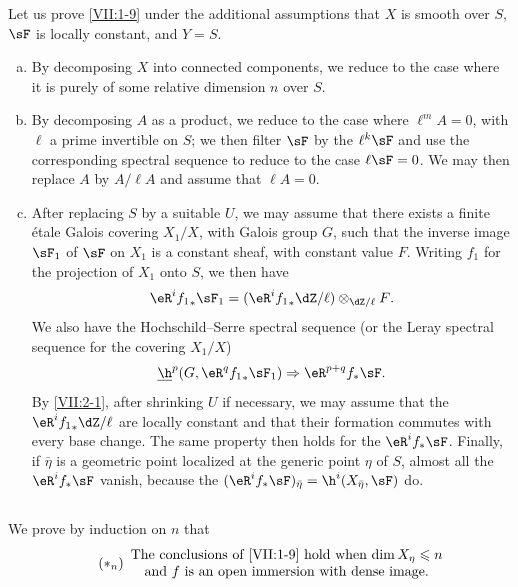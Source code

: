 Let us prove \ref{VII:1-9} under the additional assumptions that $X$ is smooth
over $S$, $\sF$ is locally constant, and $Y=S$.
\begin{enumerate}[a)]
  \item By decomposing $X$ into connected components, we reduce to the case
    where it is purely of some relative dimension $n$ over $S$.
  \item By decomposing $A$ as a product, we reduce to the case where
    $\ell^m A=0$, with $\ell$ a prime invertible on $S$; we then filter $\sF$
    by the $\ell^k \sF$ and use the corresponding spectral sequence to reduce
    to the case $\ell\sF=0$. We may then replace $A$ by $A/\ell A$ and assume
    that $\ell A=0$.
  \item {}After replacing $S$ by a suitable $U$, we may assume that there exists
    a finite étale Galois covering $X_1/X$, with Galois group $G$, such that
    the inverse image $\sF_1$ of $\sF$ on $X_1$ is a constant sheaf, with
    constant value $F$. Writing $f_1$ for the projection of $X_1$ onto $S$,
    we then have
    \[
      \eR^i {f_1}_\ast \sF_1 = (\eR^i {f_1}_\ast \dZ/\ell)\otimes_{\dZ/\ell} F \text{.} 
    \]
    We also have the Hochschild--Serre spectral sequence (or the Leray
    spectral sequence for the covering $X_1/X$)
    \[
      \underline\h^p(G,\eR^q {f_1}_\ast \sF_1) \Rightarrow \eR^{p+q} f_\ast \sF \text{.} 
    \]
    By \ref{VII:2-1}, after shrinking $U$ if necessary, we may assume that
    the $\eR^i {f_1}_\ast \dZ/\ell$ are locally constant and that their
    formation commutes with every base change. The same property then holds
    for the $\eR^i f_\ast \sF$. Finally, if $\bar\eta$ is a geometric point
    localized at the generic point $\eta$ of $S$, almost all the
    $\eR^i f_\ast\sF$ vanish, because the
    $(\eR^i f_\ast \sF)_{\bar\eta} = \h^i(X_{\bar \eta},\sF)$ do.
\end{enumerate}





\subsection{}\label{VII:2-3}

We prove by induction on $n$ that
\begin{equation*}\tag{$\ast_n$}\label{VII:eq:2-3-1}
  \begin{array}{c}
    \text{The conclusions of \ref{VII:1-9} hold when $\dim{X_\eta}\leqslant n$} \\
    \text{and $f$ is an open immersion with dense image.}
  \end{array}
\end{equation*}

